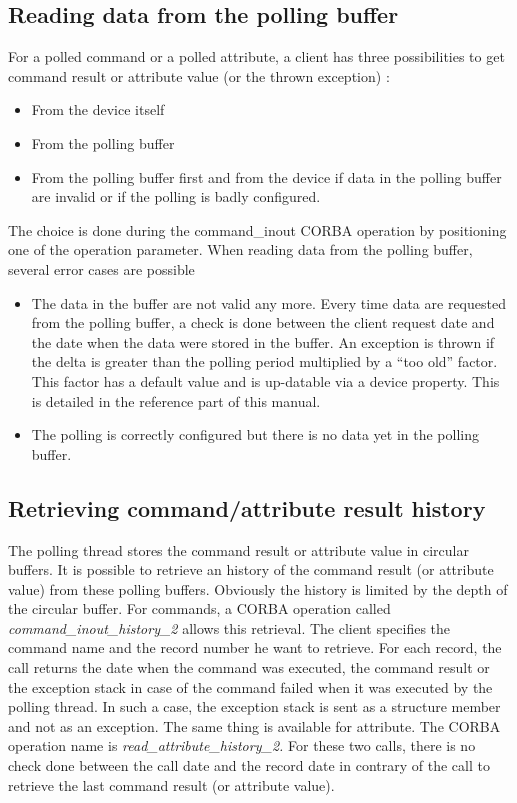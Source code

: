 \subsection{Reading data from the polling buffer}

For a polled command or a polled attribute, a client has three possibilities
to get command result or attribute value (or the thrown exception)
:
\begin{itemize}
\item From the device itself
\item From the polling buffer
\item From the polling buffer first and from the device if data in the polling
buffer are invalid or if the polling is badly configured.
\end{itemize}
The choice is done during the command\_inout CORBA operation by positioning
one of the operation parameter. When reading data from the polling
buffer, several error cases are possible 
\begin{itemize}
\item The data in the buffer are not valid any more. Every time data are
requested from the polling buffer, a check is done between the client
request date and the date when the data were stored in the buffer.
An exception is thrown if the delta is greater than the polling period
multiplied by a ``too old'' factor. This factor has a default value
and is up-datable via a device property. This is detailed in the reference
part of this manual.
\item The polling is correctly configured but there is no data yet in the
polling buffer.
\end{itemize}

\subsection{Retrieving command/attribute result history}

The polling thread stores the command result or attribute value in
circular buffers. It is possible to retrieve an history of the command
result (or attribute value) from these polling buffers. Obviously
the history is limited by the depth of the circular buffer. For commands,
a CORBA operation called \emph{command\_inout\_history\_2}
allows this retrieval. The client specifies the command name and the
record number he want to retrieve. For each record, the call returns
the date when the command was executed, the command result or the
exception stack in case of the command failed when it was executed
by the polling thread. In such a case, the exception stack is sent
as a structure member and not as an exception. The same thing is available
for attribute. The CORBA operation name is \emph{read\_attribute\_history\_2.}
For these two calls, there is no check done between the call date
and the record date in contrary of the call to retrieve the last command
result (or attribute value).

